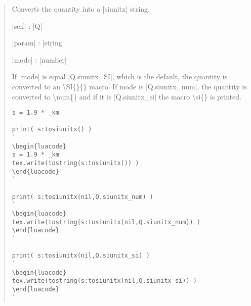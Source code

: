 \documentclass{ltxdoc}
\begin{document}
\begin{quote}
  Converts the quantity into a |siunitx| string.

  \begin{description}
  \item |self| : |Q|

  \item |param| : |string|

  \item |mode| : |number|
  \end{description}

  If |mode| is equal |Q.siunitx_SI|, which is the default, the quantity is converted to an \textbackslash SI\{\}\{\} macro. If mode is |Q.siunitx_num|, the quantity is converted to \textbackslash num\{\} and if it is |Q.siunitx_si| the macro \textbackslash si\{\} is printed.

\begin{lstlisting}
s = 1.9 * _km

print( s:tosiunitx() )
`
\begin{luacode}
s = 1.9 * _km
tex.write(tostring(s:tosiunitx()) )
\end{luacode}
`

print( s:tosiunitx(nil,Q.siunitx_num) )
`
\begin{luacode}
tex.write(tostring(s:tosiunitx(nil,Q.siunitx_num)) )
\end{luacode}
`

print( s:tosiunitx(nil,Q.siunitx_si) )
`
\begin{luacode}
tex.write(tostring(s:tosiunitx(nil,Q.siunitx_si)) )
\end{luacode}
`
\end{lstlisting}

\end{quote}
\end{document}
